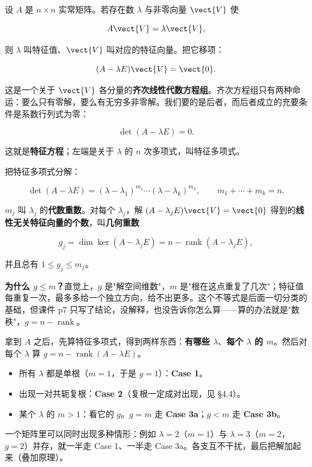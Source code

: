 \documentclass[11pt]{ctexart}
\newcommand{\rank}{\operatorname{rank}}
\begin{document}

设 $A$ 是 $n\times n$ 实常矩阵。若存在数 $\lambda$ 与非零向量 $\vect{V}$ 使

\[
A\vect{V}=\lambda\vect{V},
\]

则 $\lambda$ 叫特征值、$\vect{V}$ 叫对应的特征向量。把它移项：

\[
(A-\lambda E)\vect{V}=\vect{0}.
\]

这是一个关于 $\vect{V}$ 各分量的\textbf{齐次线性代数方程组}。齐次方程组只有两种命运：要么只有零解，要么有无穷多非零解。我们要的是后者，而后者成立的充要条件是系数行列式为零：

\[
\det(A-\lambda E)=0 .
\]

这就是\textbf{特征方程}；左端是关于 $\lambda$ 的 $n$ 次多项式，叫特征多项式。


把特征多项式分解：

\[
\det(A-\lambda E)=(\lambda-\lambda_1)^{m_1}\cdots(\lambda-\lambda_k)^{m_k},
\qquad m_1+\cdots+m_k=n .
\]

$m_j$ 叫 $\lambda_j$ 的\textbf{代数重数}。对每个 $\lambda_j$，解 $(A-\lambda_jE)\vect{V}=\vect{0}$ 得到的\textbf{线性无关特征向量的个数}，叫\textbf{几何重数}

\[
g_j=\dim\ker(A-\lambda_jE)=n-\rank(A-\lambda_jE),
\]

并且总有 $1\le g_j\le m_j$。

\textbf{为什么 $g\le m$？}直觉上，$g$ 是"解空间维数"，$m$ 是"根在这点重复了几次"；特征值每重复一次，最多多给一个独立方向，给不出更多。这个不等式是后面一切分类的基础，但课件 p7 只写了结论，没解释，也没告诉你怎么算——算的办法就是"数秩"，$g=n-\rank$。


拿到 $A$ 之后，先算特征多项式，得到两样东西：\textbf{有哪些 $\lambda$}、\textbf{每个 $\lambda$ 的 $m$}。然后对每个 $\lambda$ 算 $g=n-\rank(A-\lambda E)$。

\begin{itemize}
  \item 所有 $\lambda$ 都是单根（$m=1$，于是 $g=1$）：\textbf{Case 1}。
  \item 出现一对共轭复根：\textbf{Case 2}（复根一定成对出现，见 §4.4）。
  \item 某个 $\lambda$ 的 $m>1$：看它的 $g$。$g=m$ 走 \textbf{Case 3a}；$g<m$ 走 \textbf{Case 3b}。
\end{itemize}

一个矩阵里可以同时出现多种情形：例如 $\lambda=2$（$m=1$）与 $\lambda=3$（$m=2$，$g=2$）并存，就一半走 Case 1、一半走 Case 3a。各支互不干扰，最后把解加起来（叠加原理）。
\end{document}
